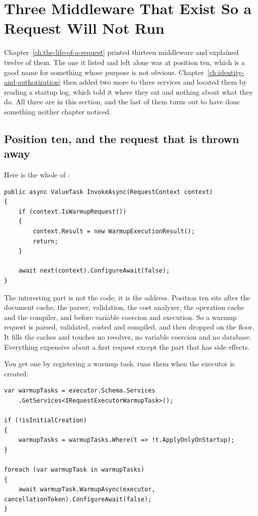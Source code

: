 \section{Three Middleware That Exist So a Request Will Not Run}
\label{sec:ch16-the-middleware-that-will-not-run}
%

Chapter~\ref{ch:the-life-of-a-request} printed thirteen middleware and explained
twelve of them. The one it listed and left alone was
 at position ten, which is a good name for
something whose purpose is not obvious.
Chapter~\ref{ch:identity-and-authorization} then added two more to three
services and located them by reading a startup log, which told it where they sat
and nothing about what they do. All three are in this section, and the last of
them turns out to have done something neither chapter noticed.

\subsection*{Position ten, and the request that is thrown away}

%
Here is the whole of :

\begin{verbatim}
public async ValueTask InvokeAsync(RequestContext context)
{
    if (context.IsWarmupRequest())
    {
        context.Result = new WarmupExecutionResult();
        return;
    }

    await next(context).ConfigureAwait(false);
}
\end{verbatim}

The interesting part is not the code, it is the address. Position ten sits after
the document cache, the parser, validation, the cost analyzer, the operation
cache and the compiler, and before variable coercion and execution. So a warmup
request is parsed, validated, costed and compiled, and then dropped on the
floor. It fills the caches and touches no resolver, no variable coercion and no
database. Everything expensive about a first request except the part that has
side effects.

%
You get one by registering a warmup task.
 runs them when the executor is created:

\begin{verbatim}
var warmupTasks = executor.Schema.Services
    .GetServices<IRequestExecutorWarmupTask>();

if (!isInitialCreation)
{
    warmupTasks = warmupTasks.Where(t => !t.ApplyOnlyOnStartup);
}

foreach (var warmupTask in warmupTasks)
{
    await warmupTask.WarmupAsync(executor, cancellationToken).ConfigureAwait(false);
}
\end{verbatim}

